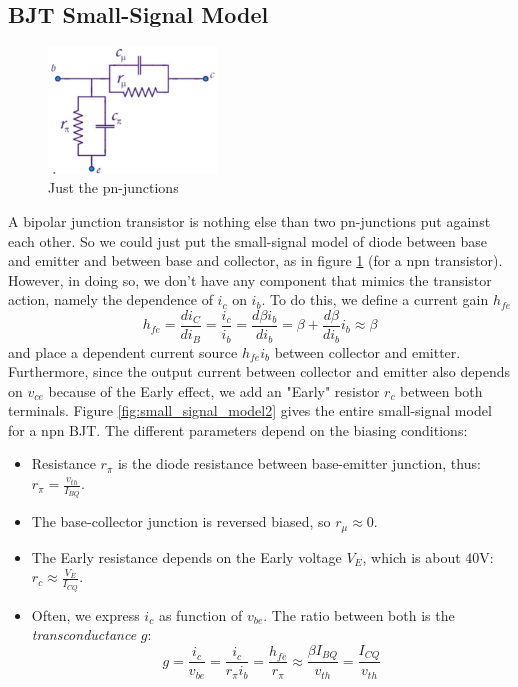 \subsection{BJT Small-Signal Model}
\label{sec:bjt_small_signal}
\begin{figure}[h!]
	\centering
	\includegraphics[width=0.4\textwidth]{figures/ch02/small_signal_model1.jpg}
	\caption{Just the pn-junctions}
	\label{fig:small_signal_model1}
\end{figure}
A bipolar junction transistor is nothing else than two pn-junctions put against each other. So we could just put the small-signal model of diode between base and emitter and between base and collector, as in figure \ref{fig:small_signal_model1} (for a npn transistor). 
However, in doing so, we don't have any component that mimics the transistor action, namely the dependence of $i_c$ on $i_b$. To do this, we define a current gain $h_{fe}$
\begin{equation}
	h_{fe} = \frac{di_C}{di_B} = \frac{i_c}{i_b} = \frac{d\beta i_b}{di_b} = \beta + \frac{d\beta}{di_b}i_b \approx \beta 
\end{equation}
and place a dependent current source $h_{fe} i_b$ between collector and emitter. Furthermore, since the output current between collector and emitter also depends on $v_{ce}$ because of the Early effect, we add an "Early" resistor $r_c$ between both terminals. Figure \ref{fig:small_signal_model2} gives the entire small-signal model for a npn BJT.
The different parameters depend on the biasing conditions:
\begin{itemize}
	\item Resistance $r_{\pi}$ is the diode resistance between base-emitter junction, thus: $r_{\pi} = \frac{v_{th}}{I_{BQ}}$.
	\item The base-collector junction is reversed biased, so $r_{\mu} \approx 0$.
	\item The Early resistance depends on the Early voltage $V_{E}$, which is about $40$V: $r_c \approx \frac{V_E}{I_{CQ}}$.
	\item Often, we express $i_c$ as function of $v_{be}$. The ratio between both is the \emph{transconductance} $g$:
	$$
	g = \frac{i_c}{v_{be}} = \frac{i_c}{r_{\pi} i_b} = \frac{h_{fe}}{r_{\pi}} \approx \frac{\beta I_{BQ}}{v_{th}} = \frac{I_{CQ}}{v_{th}}
	$$
\end{itemize}

